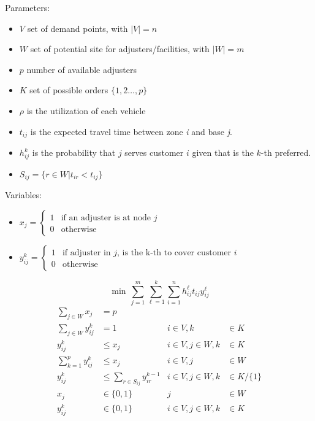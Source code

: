 \begin{frame}
  Parameters:
  \begin{itemize}
  \item $V$ set of demand points, with $|V| = n$
  \item $W$ set of potential site for adjusters/facilities, with $|W| = m$
  \item $p$ number of available adjusters
  \item $K$  set of possible orders $\{1,2\ldots,p\}$
  \item $\rho$ is the utilization of each vehicle
  \item $t_{ij}$ is the expected travel time between zone \textit{i} and base \textit{j}.
  \item $h_{ij}^{k}$ is the probability that $j$ serves customer $i$ given that
    is the $k$-th preferred.
  \item $S_{ij} = \{r\in W | t_{ir} < t_{ij}\}$
  \end{itemize}
  
  Variables:
  \begin{itemize}
  \item $x_j =
    \begin{cases} 
      1 & \mbox{if an adjuster is at node } j \\
      0 & \mbox{otherwise}
    \end{cases}$
  \item $y_{ij}^k =
    \begin{cases} 
      1 & \mbox{if adjuster in } j \mbox{, is the k-th to cover customer }i \\
      0 & \mbox{otherwise}
  \end{cases}$
  \end{itemize}
\end{frame}

\begin{frame}[allowframebreaks]{}{}

{\small
  \begin{equation}
    \min \, \sum_{j=1}^{m}{\sum_{\ell=1}^{k}{\sum_{i=1}^{n}{h_{ij}^{\ell}t_{ij}y_{ij}^{\ell}}}}
  \end{equation}
}
{\small
  \begin{align}
    \sum_{j \in W}{x_j} & = p               &                                  &\\
    \sum_{j \in W}{y_{ij}^{k}} & = 1        &          i \in V, k &\in K \\
    y_{ij}^{k} & \leq x_j                   &  i \in V,j \in W, k &\in K \\
    \sum_{k = 1}^{p}{y_{ij}^{k}} & \leq x_j &          i \in V, j &\in W \\
    y_{ij}^{k} &\leq \sum_{r\in S_{ij}}{y_{ir}^{k-1}} &  i \in V,j \in W, k &\in K/\{1\} \\
    x_{j} & \in \{0,1\}      &                  j &\in W \nonumber\\
    y_{ij}^{k} & \in \{0,1\} &  i \in V,j \in W,k &\in K \nonumber
  \end{align}
}
\end{frame}


